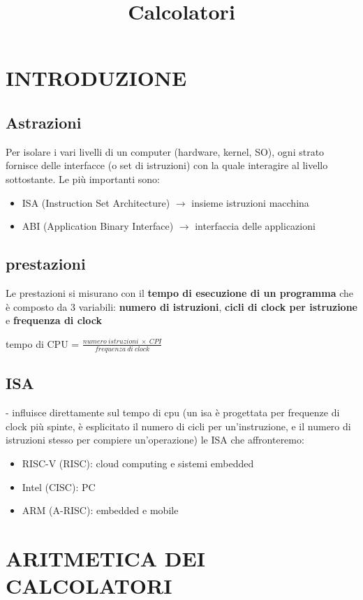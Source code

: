 \documentclass[12pt, a4paper]{article}
\title{Calcolatori}
\begin{document}
\section{INTRODUZIONE}
\subsection{Astrazioni}
Per isolare i vari livelli di un computer (hardware, kernel, SO), ogni strato fornisce delle interfacce (o set di istruzioni) con la quale interagire al livello sottostante.
Le più importanti sono:
\begin{itemize}
    \item ISA (Instruction Set Architecture) $\rightarrow$ insieme istruzioni macchina
    \item ABI (Application Binary Interface) $\rightarrow$ interfaccia delle applicazioni
\end{itemize}

\subsection{prestazioni}
Le prestazioni si misurano con il \textbf{tempo di esecuzione di un programma} che è composto da 3 variabili:
\textbf{numero di istruzioni}, \textbf{cicli di clock per istruzione} e \textbf{frequenza di clock}
\begin{center}
    tempo di CPU = $\frac{numero\ istruzioni\ \times \ CPI}{frequenza\ di\ clock}$
\end{center}

\subsection{ISA}
 - influisce direttamente sul tempo di cpu (un isa è progettata per frequenze di clock più spinte, è esplicitato il numero di cicli per un'instruzione, e il numero di istruzioni stesso per compiere un'operazione)
 le ISA che affronteremo:
 \begin{itemize}
    \item RISC-V (RISC): cloud computing e sistemi embedded
    \item Intel (CISC): PC
    \item ARM (A-RISC): embedded e mobile
 \end{itemize}


\section{ARITMETICA DEI CALCOLATORI}
\end{document}
